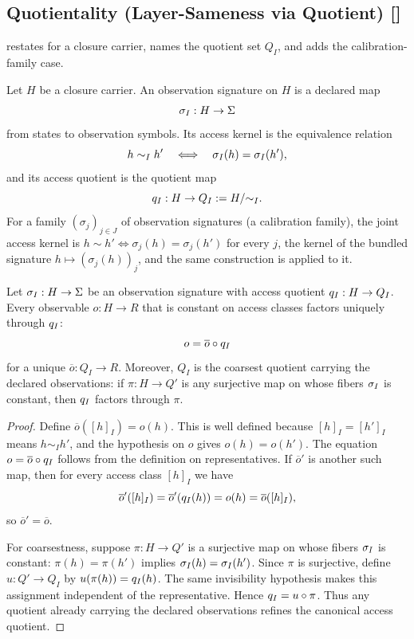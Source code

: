 \subsection{Quotientality (Layer-Sameness via Quotient) [\texorpdfstring{}{F10}]}\label{sec:access:quotientality}

 restates  for a closure
carrier, names the quotient set \(Q_I\), and adds the calibration-family case.

\begin{definition}\label{def:obs-signature}
Let \(H\) be a closure carrier.  An observation signature on \(H\)
is a declared map
\[
  \sigma_I:H\to\Sigma
\]
from states to observation symbols.  Its access kernel is the
equivalence relation
\[
  h\sim_I h'
  \quad\Longleftrightarrow\quad
  \sigma_I(h)=\sigma_I(h'),
\]
and its access quotient is the quotient map
\[
  q_I:H\to Q_I:=H/{\sim_I}.
\]
For a family \((\sigma_j)_{j\in J}\) of observation signatures (a calibration
family), the joint access kernel is \(h\sim h'\iff\sigma_j(h)=\sigma_j(h')\) for
every \(j\), the kernel of the bundled signature \(h\mapsto(\sigma_j(h))_j\), and
the same construction is applied to it.
\end{definition}

\begin{theorem}[Quotientality]\label{thm:F10}
Let \(\sigma_I:H\to\Sigma\) be an observation signature with access
quotient \(q_I:H\to Q_I\).  Every observable \(o:H\to R\) that
is constant on access classes factors uniquely through
\(q_I\):
\[
  o=\overline o\circ q_I
\]
for a unique \(\overline o:Q_I\to R\).  Moreover, \(Q_I\) is the
coarsest quotient carrying the declared observations: if
\(\pi:H\to Q'\) is any surjective map on whose fibers \(\sigma_I\) is constant,
then \(q_I\) factors through \(\pi\).
\end{theorem}
\begin{proof}
Define \(\overline o([h]_I)=o(h)\).  This is well defined because
\([h]_I=[h']_I\) means \(h\sim_I h'\), and the hypothesis on \(o\)
gives \(o(h)=o(h')\).  The equation
\(o=\overline o\circ q_I\) follows from the definition on
representatives.  If \(\overline o'\) is another such map, then for
every access class \([h]_I\) we have
\[
  \overline o'([h]_I)
  =
  \overline o'(q_I(h))
  =
  o(h)
  =
  \overline o([h]_I),
\]
so \(\overline o'=\overline o\).

For coarsestness, suppose \(\pi:H\to Q'\) is a surjective map on whose fibers
\(\sigma_I\) is constant: \(\pi(h)=\pi(h')\) implies
\(\sigma_I(h)=\sigma_I(h')\).  Since \(\pi\) is surjective, define
\(u:Q'\to Q_I\) by \(u(\pi(h))=q_I(h)\).  The same invisibility
hypothesis makes this assignment independent of the representative.
Hence \(q_I=u\circ\pi\).  Thus any quotient already carrying the
declared observations refines the canonical access quotient.
\end{proof}

